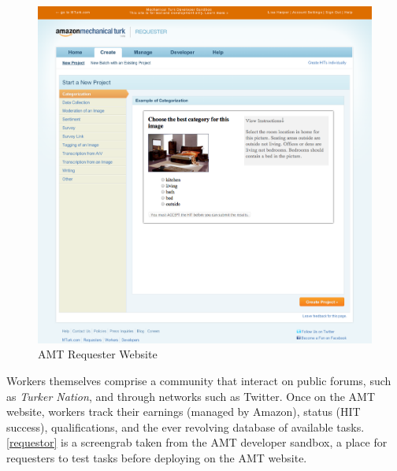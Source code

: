 \begin{figure}
\centerline{
  \includegraphics[scale=.5]{chapter4.tex/amt-creator}
  }
\caption{AMT Requester Website}
\label{requestor}
\end{figure}

Workers themselves comprise a community that interact on public forums, such as \emph{Turker Nation}, and through networks such as Twitter. Once on the AMT website, workers track their earnings (managed by Amazon), status (HIT success), qualifications, and the ever revolving database of available tasks.  \autoref{requestor}  is a screengrab taken from the AMT developer sandbox, a place for requesters to test tasks before deploying on the AMT website.

